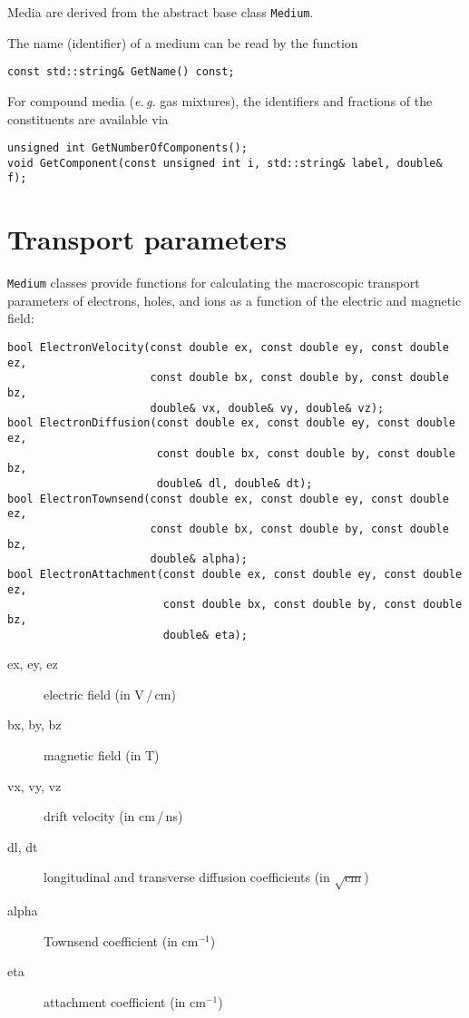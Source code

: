 Media are derived from the abstract base class \texttt{Medium}.

The name (identifier) of a medium can be read by the function
\begin{lstlisting}
const std::string& GetName() const;
\end{lstlisting}
For compound media (\textit{e.\,g.} gas mixtures), 
the identifiers and fractions of the constituents are available via
\begin{lstlisting}
unsigned int GetNumberOfComponents();
void GetComponent(const unsigned int i, std::string& label, double& f);
\end{lstlisting} 

\section{Transport parameters}

\texttt{Medium} classes provide functions for calculating the 
macroscopic transport 
parameters of electrons, holes, and ions as a function of the 
electric and magnetic field:
\begin{lstlisting}
bool ElectronVelocity(const double ex, const double ey, const double ez,
                      const double bx, const double by, const double bz,
                      double& vx, double& vy, double& vz);
bool ElectronDiffusion(const double ex, const double ey, const double ez,
                       const double bx, const double by, const double bz,
                       double& dl, double& dt);
bool ElectronTownsend(const double ex, const double ey, const double ez,
                      const double bx, const double by, const double bz,
                      double& alpha);
bool ElectronAttachment(const double ex, const double ey, const double ez,
                        const double bx, const double by, const double bz,
                        double& eta);
\end{lstlisting}
\begin{description}
  \item[ex, ey, ez] electric field (in V\,/\,cm)
  \item[bx, by, bz] magnetic field (in T)
  \item[vx, vy, vz] drift velocity (in cm\,/\,ns)
  \item[dl, dt] longitudinal and transverse diffusion coefficients 
     (in \(\sqrt{\text{cm}}\))
  \item[alpha] Townsend coefficient (in \(\text{cm}^{-1}\))
  \item[eta] attachment coefficient (in \(\text{cm}^{-1}\))
\end{description}

